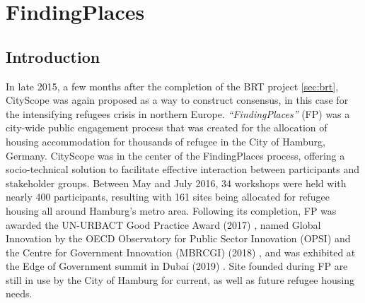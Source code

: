 \section{FindingPlaces}\label{sec:findingplaces}
{
    \subsection{Introduction}

    {
        In late 2015, a few months after the completion of the BRT project \eqref{sec:brt}, CityScope was again proposed as a way to construct consensus, in this case for the intensifying refugees crisis in northern Europe. \textit{``FindingPlaces''} (FP) was a city-wide public engagement process that was created for the allocation of housing accommodation for thousands of refugee in the City of Hamburg, Germany. CityScope was in the center of the FindingPlaces process, offering a socio-technical solution to facilitate effective interaction between participants and stakeholder groups. Between May and July 2016, 34 workshops were held with nearly 400 participants, resulting with 161 sites being allocated for refugee housing all around Hamburg's metro area. Following its completion, FP was awarded the UN-URBACT Good Practice Award (2017) \cite{urbact:online}, named Global Innovation by the OECD Observatory for Public Sector Innovation (OPSI) and the Centre for Government Innovation (MBRCGI) (2018) \cite{opsi:online}, and was exhibited at the Edge of Government summit in Dubai (2019) \cite{EdgeofGo35:online}. Site founded during FP are still in use by the City of Hamburg for current, as well as future refugee housing needs.
    }

}

